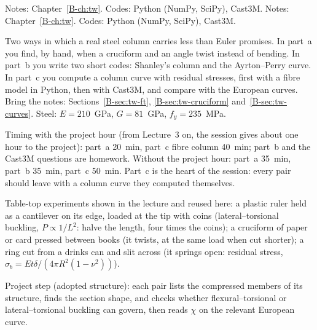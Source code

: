 \clearpage
\renewcommand{\sessionchapter}{Chapter 5 -- Rods II: thin-walled members and real materials}
\setcounter{spart}{0}
\setcounter{algorithm}{0}
\ifanswers
{}
  {Notes: Chapter~\ref{B-ch:tw}. Codes: Python (NumPy, SciPy), Cast3M.}
\else
{}
  {Notes: Chapter~\ref{B-ch:tw}. Codes: Python (NumPy, SciPy), Cast3M.}
\fi

\noindent
Two ways in which a real steel column carries less than Euler promises. In part~a you find, by hand, when
a cruciform and an angle twist instead of bending. In part~b you write two short codes: Shanley's column and
the Ayrton--Perry curve. In part~c you compute a column curve with residual stresses, first with a fibre
model in Python, then with Cast3M, and compare with the European curves. Bring the notes:
Sections~\ref{B-sec:tw-ft}, \ref{B-sec:tw-cruciform} and~\ref{B-sec:tw-curves}. Steel: $E = 210$~GPa,
$G = 81$~GPa, $f_y = 235$~MPa.

\begin{instructor}
Timing with the project hour (from Lecture~3 on, the session gives about one hour to the project): part~a
20~min, part~c fibre column 40~min; part~b and the Cast3M questions are homework. Without the project
hour: part~a 35~min, part~b 35~min, part~c 50~min. Part~c is the heart of the session: every pair should
leave with a column curve they computed themselves.

Table-top experiments shown in the lecture and reused here: a plastic ruler held as a cantilever on its
edge, loaded at the tip with coins (lateral--torsional buckling, $P \propto 1/L^2$: halve the length, four
times the coins); a cruciform of paper or card pressed between books (it twists, at the same load when
cut shorter); a ring cut from a drinks can and slit across (it springs open: residual stress,
$\sigma_b = Et\delta/(4\pi R^2(1-\nu^2))$).

Project step (adopted structure): each pair lists the compressed members of its structure, finds the
section shape, and checks whether flexural--torsional or lateral--torsional buckling can govern, then reads
$\chi$ on the relevant European curve.
\end{instructor}


